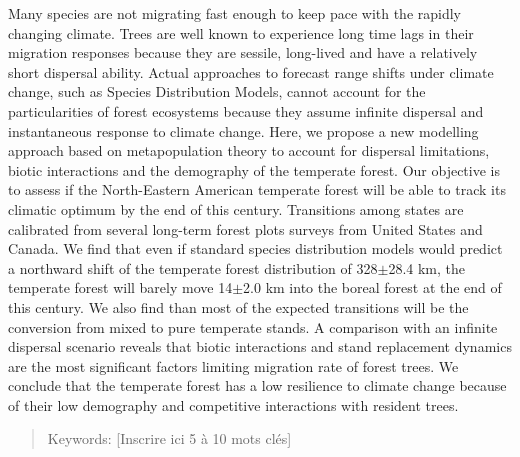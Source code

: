 \abstract
\begin{singlespace}

  Many species are not migrating fast enough to keep pace with the rapidly changing climate. Trees are well known to experience long time lags in their migration responses because they are sessile, long-lived and have a relatively short dispersal ability. Actual approaches to forecast range shifts under climate change, such as Species Distribution Models, cannot account for the particularities of forest ecosystems because they assume infinite dispersal and instantaneous response to climate change. Here, we propose a new modelling approach based on metapopulation theory to account for dispersal limitations, biotic interactions and the demography of the temperate forest. Our objective is to assess if the North-Eastern American temperate forest will be able to track its climatic optimum by the end of this century. Transitions among states are calibrated from several long-term forest plots surveys from United States and Canada. We find that even if standard species distribution models would predict a northward shift of the temperate forest distribution of 328$\pm$28.4 km, the temperate forest will barely move 14$\pm$2.0 km into the boreal forest at the end of this century. We also find than most of the expected transitions will be the conversion from mixed to pure temperate stands. A comparison with an infinite dispersal scenario reveals that biotic interactions and stand replacement dynamics are the most significant factors limiting migration rate of forest trees. We conclude that the temperate forest has a low resilience to climate change because of their low demography and competitive interactions with resident trees.
  
  \begin{quote}
    Keywords: [Inscrire ici 5 à 10 mots clés]
  \end{quote}
\end{singlespace}
\cleardoublepage


\tabledesmatieres


\listedestableaux


\listedesfigures



\cleardoublepage
